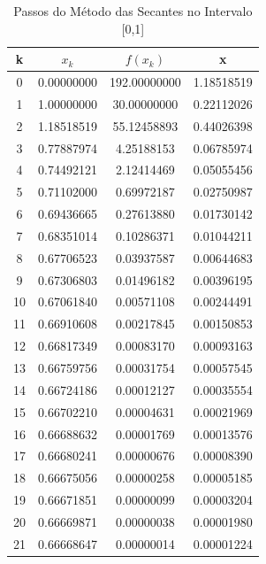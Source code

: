 \documentclass{article}
\begin{document}
\begin{table}[H]
\vspace{-10pt}
\centering
\caption{Passos do Método das Secantes no Intervalo [0,1]}
\label{Secantes1}
\begin{tabular}{|c|c| c| c|}
    \hline \textbf{k} & \textbf{$x_k$} & \textbf{$f(x_k)$} & \textbf{x} \\
    \hline
0  & 0.00000000   & 192.00000000  & 1.18518519  \\ \hline
1  & 1.00000000   & 30.00000000   & 0.22112026  \\ \hline
2  & 1.18518519   & 55.12458893   & 0.44026398  \\ \hline
3  & 0.77887974   & 4.25188153    & 0.06785974  \\ \hline
4  & 0.74492121   & 2.12414469    & 0.05055456  \\ \hline
5  & 0.71102000   & 0.69972187    & 0.02750987  \\ \hline
6  & 0.69436665   & 0.27613880    & 0.01730142  \\ \hline
7  & 0.68351014   & 0.10286371    & 0.01044211  \\ \hline
8  & 0.67706523   & 0.03937587    & 0.00644683  \\ \hline
9  & 0.67306803   & 0.01496182    & 0.00396195  \\ \hline
10 & 0.67061840   & 0.00571108    & 0.00244491  \\ \hline
11 & 0.66910608   & 0.00217845    & 0.00150853  \\ \hline
12 & 0.66817349   & 0.00083170    & 0.00093163  \\ \hline
13 & 0.66759756   & 0.00031754    & 0.00057545  \\ \hline
14 & 0.66724186   & 0.00012127    & 0.00035554  \\ \hline
15 & 0.66702210   & 0.00004631    & 0.00021969  \\ \hline
16 & 0.66688632   & 0.00001769    & 0.00013576  \\ \hline
17 & 0.66680241   & 0.00000676    & 0.00008390  \\ \hline
18 & 0.66675056   & 0.00000258    & 0.00005185  \\ \hline
19 & 0.66671851   & 0.00000099    & 0.00003204  \\ \hline
20 & 0.66669871   & 0.00000038    & 0.00001980  \\ \hline
21 & 0.66668647   & 0.00000014    & 0.00001224  \\ \hline
\end{tabular}
\end{table}
\end{document}
